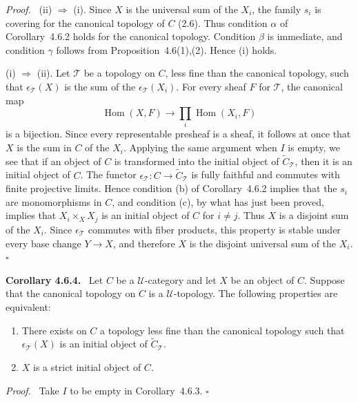 \documentclass[11pt]{article}
\newcommand{\U}{\mathcal{U}}
\newcommand{\Hom}{\operatorname{Hom}}
\newcommand{\qedtext}{\hfill\(\square\)}
\newenvironment{statement}[1]{\par\medskip\noindent\textbf{#1.}\ }{\par\medskip}
\newenvironment{prooftext}{\par\noindent\emph{Proof.}\ }{\par\medskip}
\begin{document}
\begin{prooftext}
(ii) \(\Rightarrow\) (i). Since \(X\) is the universal sum of the \(X_i\), the family \(s_i\) is covering for the canonical topology of \(C\) (2.6). Thus condition \(\alpha\) of Corollary~4.6.2 holds for the canonical topology. Condition \(\beta\) is immediate, and condition \(\gamma\) follows from Proposition~4.6(1),(2). Hence (i) holds.

(i) \(\Rightarrow\) (ii). Let \(\mathcal T\) be a topology on \(C\), less fine than the canonical topology, such that \(\epsilon_{\mathcal T}(X)\) is the sum of the \(\epsilon_{\mathcal T}(X_i)\). For every sheaf \(F\) for \(\mathcal T\), the canonical map
\[
\Hom(X,F)\to \prod_i\Hom(X_i,F)
\]
is a bijection. Since every representable presheaf is a sheaf, it follows at once that \(X\) is the sum in \(C\) of the \(X_i\). Applying the same argument when \(I\) is empty, we see that if an object of \(C\) is transformed into the initial object of \(\widetilde C_{\mathcal T}\), then it is an initial object of \(C\). The functor \(\epsilon_{\mathcal T}:C\to\widetilde C_{\mathcal T}\) is fully faithful and commutes with finite projective limits. Hence condition (b) of Corollary~4.6.2 implies that the \(s_i\) are monomorphisms in \(C\), and condition (c), by what has just been proved, implies that \(X_i\times_XX_j\) is an initial object of \(C\) for \(i\ne j\). Thus \(X\) is a disjoint sum of the \(X_i\). Since \(\epsilon_{\mathcal T}\) commutes with fiber products, this property is stable under every base change \(Y\to X\), and therefore \(X\) is the disjoint universal sum of the \(X_i\). \qedtext
\end{prooftext}

\begin{statement}{Corollary 4.6.4}
Let \(C\) be a \(\U\)-category and let \(X\) be an object of \(C\). Suppose that the canonical topology on \(C\) is a \(\U\)-topology. The following properties are equivalent:
\begin{enumerate}[label=(\roman*)]
\item There exists on \(C\) a topology less fine than the canonical topology such that \(\epsilon_{\mathcal T}(X)\) is an initial object of \(\widetilde C_{\mathcal T}\).
\item \(X\) is a strict initial object of \(C\).
\end{enumerate}
\end{statement}

\begin{prooftext}
Take \(I\) to be empty in Corollary~4.6.3. \qedtext
\end{prooftext}
\end{document}
